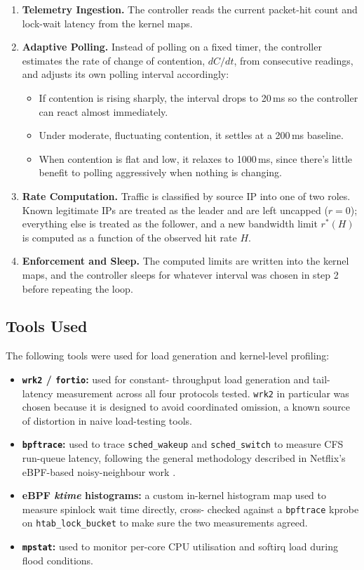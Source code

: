 \begin{enumerate}
    \item \textbf{Telemetry Ingestion.} The controller reads the current
    packet-hit count and lock-wait latency from the kernel maps.
    \item \textbf{Adaptive Polling.} Instead of polling on a fixed timer,
    the controller estimates the rate of change of contention,
    $dC/dt$, from consecutive readings, and adjusts its own polling
    interval accordingly:
    \begin{itemize}
        \item If contention is rising sharply, the interval drops to
        20\,ms so the controller can react almost immediately.
        \item Under moderate, fluctuating contention, it settles at a
        200\,ms baseline.
        \item When contention is flat and low, it relaxes to 1000\,ms,
        since there's little benefit to polling aggressively when nothing
        is changing.
    \end{itemize}
    \item \textbf{Rate Computation.} Traffic is classified by source IP
    into one of two roles. Known legitimate IPs are treated as the
    leader and are left uncapped ($r = 0$); everything else is treated as
    the follower, and a new bandwidth limit $r^*(H)$ is computed as a
    function of the observed hit rate $H$.
    \item \textbf{Enforcement and Sleep.} The computed limits are written
    into the kernel maps, and the controller sleeps for whatever interval
    was chosen in step 2 before repeating the loop.
\end{enumerate}

\subsection{Tools Used}
The following tools were used for load generation and kernel-level
profiling:
\begin{itemize}
    \item \textbf{\texttt{wrk2} / \texttt{fortio}:} used for constant-
    throughput load generation and tail-latency measurement across all
    four protocols tested. \texttt{wrk2} in particular was chosen because
    it is designed to avoid coordinated omission, a known source of
    distortion in naive load-testing tools.
    \item \textbf{\texttt{bpftrace}:} used to trace \texttt{sched\_wakeup}
    and \texttt{sched\_switch} to measure CFS run-queue latency, following
    the general methodology described in Netflix's eBPF-based
    noisy-neighbour work \cite{netflix2024noisy}.
    \item \textbf{eBPF \textit{ktime} histograms:} a custom in-kernel
    histogram map used to measure spinlock wait time directly, cross-
    checked against a \texttt{bpftrace} kprobe on \texttt{htab\_lock\_bucket}
    to make sure the two measurements agreed.
    \item \textbf{\texttt{mpstat}:} used to monitor per-core CPU
    utilisation and softirq load during flood conditions.
\end{itemize}

